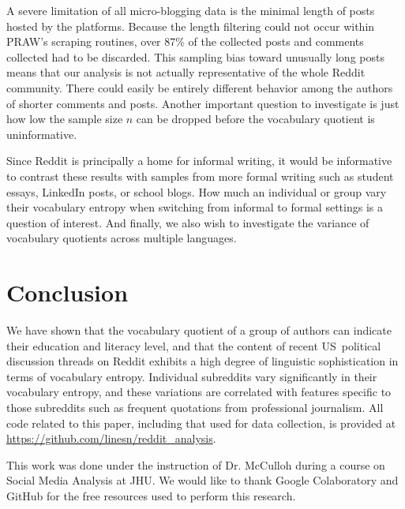 \documentclass[sigconf]{acmart}
\begin{document}
A severe limitation of all micro-blogging data is the minimal length of
posts hosted by the platforms. Because the length filtering could not occur
within PRAW's scraping routines, over 87\% of the collected posts and
comments collected had to be discarded. This sampling bias toward unusually
long posts means that our analysis is not actually representative of the
whole Reddit community. There could easily be entirely different behavior among
the authors of shorter comments and posts. Another important question to
investigate is just how low
the sample size $n$ can be dropped before the vocabulary quotient is
uninformative. 

Since Reddit is principally a home for informal writing, it would be
informative to contrast these results with samples from more formal writing
such as student essays, LinkedIn posts, or school blogs. How much an
individual or group vary their vocabulary entropy when switching from
informal to formal settings is a question of interest. And finally, we also
wish to investigate the variance of vocabulary quotients across multiple
languages.

\section{Conclusion}

We have shown that the vocabulary quotient of a group of authors can
indicate their education and literacy level, and that the content of recent
US\ political discussion threads on Reddit exhibits a high degree of
linguistic sophistication in terms of vocabulary entropy. Individual
subreddits vary significantly in their vocabulary entropy, and these
variations are correlated with features specific to those subreddits such as
frequent quotations from professional journalism. All code related to this
paper, including that used for data collection, is provided at 
\href{https://github.com/linesn/reddit\_analysis}{https://github.com/linesn/reddit\_analysis}.

\begin{acks}
  This work was done under the instruction of Dr. McCulloh during a course on Social Media Analysis at JHU.
  We would like to thank Google Colaboratory and GitHub for the free resources used to perform this research.
\end{acks}




\end{document}
